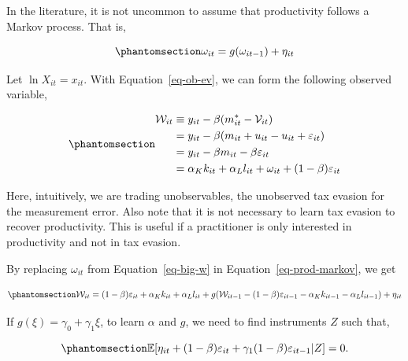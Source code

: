 \documentclass[
  12pt,
  letterpaper,
  oneside,
  openany]{report}
\begin{document}
In the literature, it is not uncommon to assume that productivity
follows a Markov process. That is,

\begin{equation}\protect\phantomsection\label{eq-prod-markov}{
    \omega_{it}=g(\omega_{it-1})+\eta_{it}
}\end{equation}

Let \(\ln X_{it}=x_{it}\). With Equation~\ref{eq-ob-ev}, we can form the
following observed variable,

\begin{equation}\protect\phantomsection\label{eq-big-w}{
\begin{aligned}
    \mathcal W_{it} & \equiv y_{it} - \beta (m^*_{it}-\mathcal{V}_{it})\\
    & = y_{it} - \beta (m_{it}+u_{it}-u_{it}+\varepsilon_{it})\\
    & = y_{it} - \beta m_{it}-\beta\varepsilon_{it}\\
    & = \alpha_K k_{it}+\alpha_L l_{it}+\omega_{it}+(1-\beta)\varepsilon_{it}
\end{aligned}
}\end{equation}

Here, intuitively, we are trading unobservables, the unobserved tax
evasion for the measurement error. Also note that it is not necessary to
learn tax evasion to recover productivity. This is useful if a
practitioner is only interested in productivity and not in tax evasion.

By replacing \(\omega_{it}\) from Equation~\ref{eq-big-w} in
Equation~\ref{eq-prod-markov}, we get

\begin{equation}\protect\phantomsection\label{eq-big-w-reg}{
\begin{aligned}
    \mathcal W_{it}=(1-\beta)\varepsilon_{it}+\alpha_K k_{it}+\alpha_L l_{it}+g(\mathcal W_{it-1}-(1-\beta)\varepsilon_{it-1}-\alpha_K k_{it-1}-\alpha_L l_{it-1})+\eta_{it}
\end{aligned}
}\end{equation}

If \(g(\xi)=\gamma_0 +\gamma_1\xi\), to learn \(\alpha\) and \(g\), we
need to find instruments \(Z\) such that,

\begin{equation}\protect\phantomsection\label{eq-eta-moments}{
\mathbb{E}[\eta_{it}+(1-\beta)\varepsilon_{it}+\gamma_1(1-\beta)\varepsilon_{it-1}|Z]=0.
}\end{equation}
\end{document}
